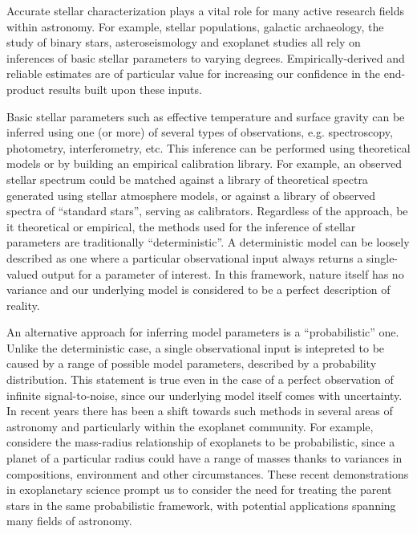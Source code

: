 


Accurate stellar characterization plays a vital role for many active research
fields within astronomy.
For example, stellar populations, galactic archaeology, the study of binary
stars, asteroseismology and exoplanet studies all rely on inferences of basic
stellar parameters to varying degrees.
Empirically-derived and reliable estimates are of particular value for
increasing our confidence in the end-product results built upon these inputs.

Basic stellar parameters such as effective temperature and surface gravity
can be inferred using one (or more) of several types of observations, e.g.
spectroscopy, photometry, interferometry, etc.
This inference can be performed using theoretical models or by building an
empirical calibration library.
For example, an observed stellar spectrum could be matched against a library of
theoretical spectra generated using stellar atmosphere models, or against a
library of observed spectra of ``standard stars'', serving as calibrators.
Regardless of the approach, be it theoretical or empirical, the methods used
for the inference of stellar parameters are traditionally ``deterministic''.
A deterministic model can be loosely described as one where a particular
observational input always returns a single-valued output for a parameter of
interest.
In this framework, nature itself has no variance and our underlying model is
considered to be a perfect description of reality.

An alternative approach for inferring model parameters is a ``probabilistic''
one.
Unlike the deterministic case, a single observational input is intepreted to be
caused by a range of possible model parameters, described by a probability
distribution.
This statement is true even in the case of a perfect observation of infinite
signal-to-noise, since our underlying model itself comes with uncertainty.
In recent years there has been a shift towards such methods in several areas of
 astronomy and particularly within the exoplanet community.
For example, \citet{wolfgang:2015} considere the mass-radius relationship
of exoplanets to be probabilistic, since a planet of a particular radius could
have a range of masses thanks to variances in compositions, environment and
other circumstances.
These recent demonstrations in exoplanetary science prompt us to consider the
need for treating the parent stars in the same probabilistic framework, with
potential applications spanning many fields of astronomy.

